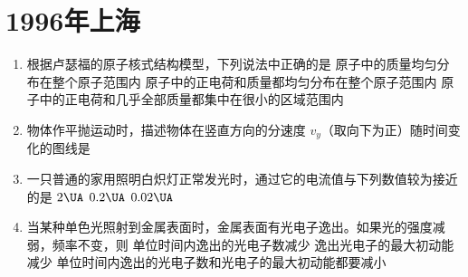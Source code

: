 \documentclass[\gkver]{gaokaozhenti}
\begin{document}
\chapter{1996年上海}

\begin{enumerate}
\item
根据卢瑟福的原子核式结构模型，下列说法中正确的是
{原子中的质量均匀分布在整个原子范围内}
{原子中的正电荷和质量都均匀分布在整个原子范围内}
{原子中的正电荷和几乎全部质量都集中在很小的区域范围内}

\item
物体作平抛运动时，描述物体在竖直方向的分速度 $v_{y}$（取向下为正）随时间变化的图线是
\fourchoices[answer=D, ispicture=true, hA=2.69cm, hB=2.69cm, hC=2.69cm, hD=2.69cm]
{}
{}
{}
{}

\item
一只普通的家用照明白炽灯正常发光时，通过它的电流值与下列数值较为接近的是
\fourchoices[answer=C]
{$20\UA$}
{$2\UA$}
{$0.2\UA$}
{$0.02\UA$}

\item
当某种单色光照射到金属表面时，金属表面有光电子逸出。如果光的强度减弱，频率不变，则
{单位时间内逸出的光电子数减少}
{逸出光电子的最大初动能减少}
{单位时间内逸出的光电子数和光电子的最大初动能都要减小}


\end{enumerate}
\end{document}
